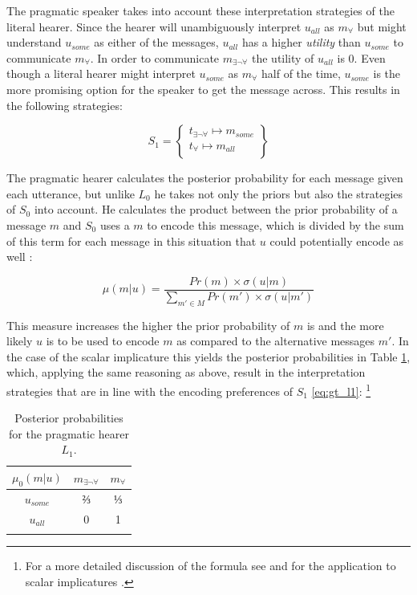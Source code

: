 The pragmatic speaker takes into account these interpretation strategies of the literal hearer. Since the hearer will unambiguously interpret $u_{all}$ as $m_{\forall}$ but might understand $u_{some}$ as either of the messages, $u_{all}$ has a higher \textit{utility} than $u_{some}$ to communicate $m_{\forall}$. In order to communicate $m_{\exists\neg\forall}$ the utility of $u_{all}$ is 0. Even though a literal hearer might interpret $u_{some}$ as $m_{\forall}$ half of the time, $u_{some}$ is the more promising option for the speaker to get the message across. This results in the following strategies:

\begin{equation}
 S_1 = \begin{Bmatrix} t_{\exists\neg\forall} \mapsto m_{some}\\
        t_{\forall} \mapsto m_{all}\\
       \end{Bmatrix}
\end{equation}

The pragmatic hearer calculates the posterior probability for each message given each utterance, but unlike $L_0$ he takes not only the priors but also the strategies of $S_0$ into account. He calculates the product between the prior probability of a message $m$ and $S_0$ uses a $m$ to encode this message, which is divided by the sum of this term for each message in this situation that $u$ could potentially encode as well \citep[27]{franke2009}:

\begin{equation}
\displaystyle \mu(m|u) = \frac{Pr(m) \times \sigma (u|m)}{\sum_{m'\in M} Pr(m') \times \sigma(u|m')} %
\end{equation}

This measure increases the higher the prior probability of $m$ is and the more likely $u$ is to be used to encode $m$ as compared to the alternative messages $m'$. In the case of the scalar implicature this yields the posterior probabilities in Table \ref{tab:gt-si-l1}, which, applying the same reasoning as above, result in the interpretation strategies that are in line with the encoding preferences of $S_1$ \ref{eq:gt_l1}:%
%
\footnote{For a more detailed discussion of the formula see \citep[26--27]{franke2009} and for the application to scalar implicatures \citep[60]{franke2009}.}\afterfn%
%

\begin{table}[t]
\begin{tabular}{c c c}
 \lsptoprule
 $\mu_0(m|u)$ & $m_{\exists\neg\forall}$ & $m_{\forall}$\\
\midrule
$u_{some}$ & ⅔ & ⅓ \\
$u_{all}$ & 0 & 1\\
\lspbottomrule
\end{tabular}
\caption{Posterior probabilities for the pragmatic hearer $L_1$.\label{tab:gt-si-l1}}
\end{table}

